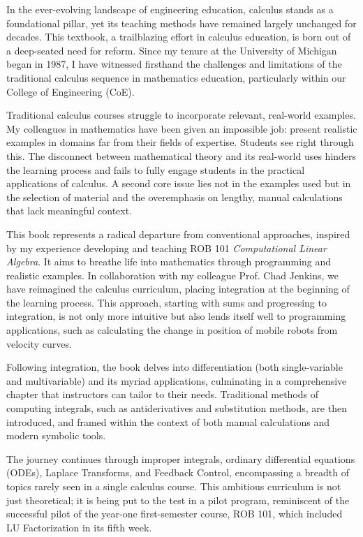 
In the ever-evolving landscape of engineering education, calculus stands as a foundational pillar, yet its teaching methods have remained largely unchanged for decades. This textbook, a trailblazing effort in calculus education, is born out of a deep-seated need for reform. Since my tenure at the University of Michigan began in 1987, I have witnessed firsthand the challenges and limitations of the traditional calculus sequence in mathematics education, particularly within our College of Engineering (CoE).

Traditional calculus courses struggle to incorporate relevant, real-world examples. My colleagues in mathematics have been given an impossible job: present realistic examples in domains far from their fields of expertise. Students see right through this. The disconnect between mathematical theory and its real-world uses hinders the learning process and fails to fully engage students in the practical applications of calculus. A second core issue lies not in the examples used but in the selection of material and the overemphasis on lengthy, manual calculations that lack meaningful context. 

This book represents a radical departure from conventional approaches, inspired by my experience developing and teaching ROB 101 \textit{Computational Linear Algebra}. It aims to breathe life into mathematics through programming and realistic examples. In collaboration with my colleague Prof. Chad Jenkins, we have reimagined the calculus curriculum, placing integration at the beginning of the learning process. This approach, starting with sums and progressing to integration, is not only more intuitive but also lends itself well to programming applications, such as calculating the change in position of mobile robots from velocity curves.

Following integration, the book delves into differentiation (both single-variable and multivariable) and its myriad applications, culminating in a comprehensive chapter that instructors can tailor to their needs. Traditional methods of computing integrals, such as antiderivatives and substitution methods, are then introduced, and framed within the context of both manual calculations and modern symbolic tools.

The journey continues through improper integrals, ordinary differential equations (ODEs), Laplace Transforms, and Feedback Control, encompassing a breadth of topics rarely seen in a single calculus course. This ambitious curriculum is not just theoretical; it is being put to the test in a pilot program, reminiscent of the successful pilot of the year-one first-semester course, ROB 101, which included LU Factorization in its fifth week.

